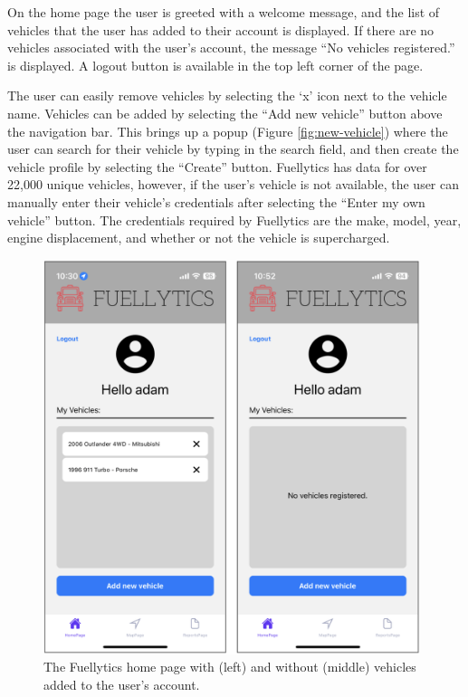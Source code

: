 \documentclass[11pt, oneside]{article}
\begin{document}
On the home page the user is greeted with a welcome message, and the list of vehicles that the user has added to their account is displayed.  If there are no vehicles associated with the user's account, the message ``No vehicles registered.'' is displayed.  A logout button is available in the top left corner of the page.

The user can easily remove vehicles by selecting the `x' icon next to the vehicle name. Vehicles can be added by selecting the ``Add new vehicle'' button above the navigation bar.  This brings up a popup (Figure \ref*{fig:new-vehicle}) where the user can search for their vehicle by typing in the search field, and then create the vehicle profile by selecting the ``Create'' button.  Fuellytics has data for over 22,000 unique vehicles, however, if the user's vehicle is not available, the user can manually enter their vehicle's credentials after selecting the ``Enter my own vehicle'' button.  The credentials required by Fuellytics are the make, model, year, engine displacement, and whether or not the vehicle is supercharged.
\begin{figure}[H]
\centerline{\includegraphics[width=11cm]{img/homepage.png}}
\caption{\label{fig:homepage} The Fuellytics home page with (left) and without (middle) vehicles added to the user's account.}
\end{figure}
\end{document}

